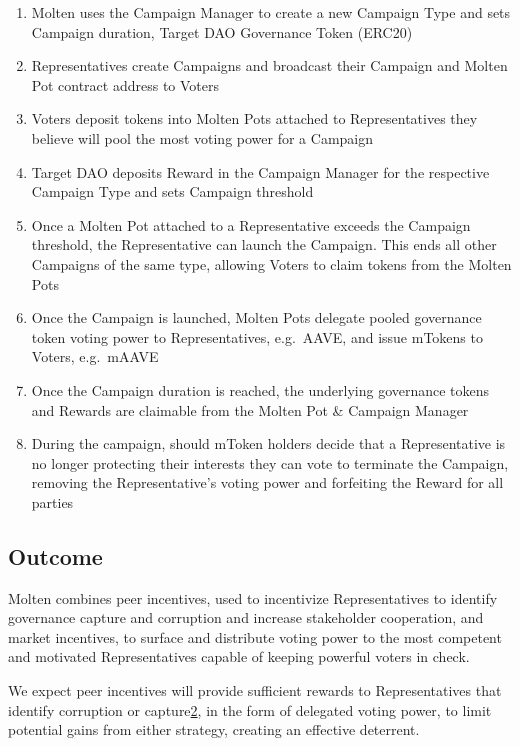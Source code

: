 \documentclass[
]{article}
\begin{document}
\begin{enumerate}
\def\labelenumi{\arabic{enumi}.}
\item
  Molten uses the Campaign Manager to create a new Campaign Type and
  sets Campaign duration, Target DAO Governance Token (ERC20)
\item
  Representatives create Campaigns and broadcast their Campaign and
  Molten Pot contract address to Voters
\item
  Voters deposit tokens into Molten Pots attached to Representatives
  they believe will pool the most voting power for a Campaign
\item
  Target DAO deposits Reward in the Campaign Manager for the respective
  Campaign Type and sets Campaign threshold
\item
  Once a Molten Pot attached to a Representative exceeds the Campaign
  threshold, the Representative can launch the Campaign. This ends all
  other Campaigns of the same type, allowing Voters to claim tokens from
  the Molten Pots
\item
  Once the Campaign is launched, Molten Pots delegate pooled governance
  token voting power to Representatives, e.g.~AAVE, and issue mTokens to
  Voters, e.g.~mAAVE
\item
  Once the Campaign duration is reached, the underlying governance
  tokens and Rewards are claimable from the Molten Pot \& Campaign
  Manager
\item
  During the campaign, should mToken holders decide that a
  Representative is no longer protecting their interests they can vote
  to terminate the Campaign, removing the Representative's voting power
  and forfeiting the Reward for all parties
\end{enumerate}

\hypertarget{outcome}{%
\subsection{Outcome}\label{outcome}}

Molten combines peer incentives, used to incentivize Representatives to
identify governance capture and corruption and increase stakeholder
cooperation, and market incentives, to surface and distribute voting
power to the most competent and motivated Representatives capable of
keeping powerful voters in check.

We expect peer incentives will provide sufficient rewards to
Representatives that identify corruption or
capture\href{https://doi.org/10.1371/journal.pcbi.1004232}{2}, in the
form of delegated voting power, to limit potential gains from either
strategy, creating an effective deterrent.
\end{document}
